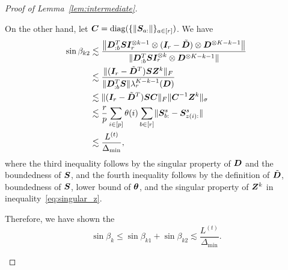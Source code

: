 \documentclass[lettersize,onecolumn,journal]{IEEEtran}
\theoremstyle{definition}
\theoremstyle{definition}
\def\fixme#1#2{\textbf{\color{red}[FIXME (#1): #2]}}
\begin{document}
\begin{proof}[Proof of Lemma~\ref{lem:intermediate}]
\begin{enumerate}
    On the other hand, let $\bm C = \text{diag}(\{\lVert\bm S_{a:}\rVert\}_{a \in [r]})$. We have 
    \begin{align}
        \sin \beta_{k2} &\lesssim \frac{ \left\lVert\bm{D}_{:b}^{T} \bm S \bm I_r^{\otimes k-1} \otimes (\bm I_r - \tilde {\bm{D}}) \otimes \bm{D}^{\otimes K-k-1} \right\rVert }{\lVert\bm{D}_{:b}^{T} \bm S \bm I_r^{\otimes k} \otimes \bm{D}^{\otimes K-k-1} \rVert  }\\
        & \lesssim \frac{ \lVert(\bm I_r - \tilde {\bm{D}}^T) \bm S \bm Z^k\rVert_F }{\lVert\bm{D}_{:b}^{T} \bm S\rVert \lambda_r^{K-k-1}(\bm{D})} \\
        & \lesssim \lVert(\bm I_r - \tilde {\bm{D}}^T) \bm S \bm C \rVert_F \lVert\bm C^{-1} \bm Z^k\rVert_{\sigma}\\
        & \lesssim \frac{r}{p} \sum_{i \in [p]} \theta(i) \sum_{b \in [r]} \lVert\bm S_{b:}^s - \bm S_{z(i):}^s\rVert \\
        & \lesssim \frac{L^{(t)}}{\Delta_{\min}}, 
    \end{align}
    where the third inequality follows by the singular property of $\bm{D}$ and the boundedness of $\bm S$, and the fourth inequality follows by the definition of $\tilde {\bm{D}}$, boundedness of $\bm S$, lower bound of $\boldsymbol{\theta}$, and the singular property of $\bm Z^k$ in inequality~\eqref{eq:singular_z}. 
    
    Therefore, we have shown the 
    \begin{equation}
        \sin \beta_k \leq \sin \beta_{k1} + \sin \beta_{k2} \lesssim \frac{L^{(t)}}{\Delta_{\min}}.
    \end{equation}

    
   
    
    

\end{enumerate}
\end{proof}
\end{document}
